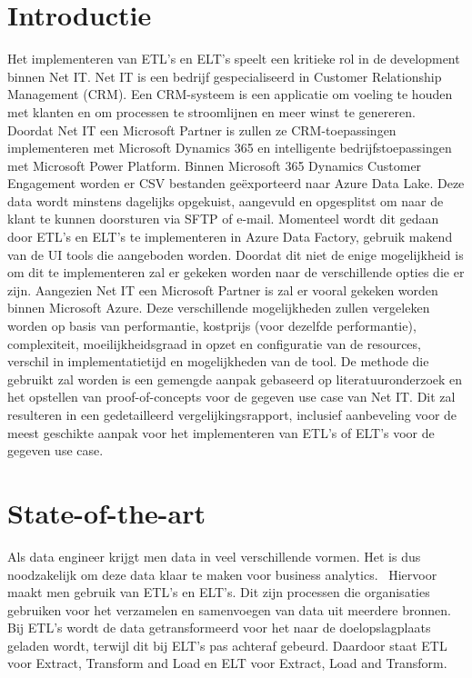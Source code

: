 
\section{Introductie}%
\label{sec:introductie}

Het implementeren van ETL's en ELT's speelt een kritieke rol in de development binnen Net IT. Net IT is een bedrijf gespecialiseerd in Customer Relationship Management (CRM). Een CRM-systeem is een applicatie om voeling te houden met klanten en om processen te stroomlijnen en meer winst te genereren. Doordat Net IT een Microsoft Partner is zullen ze CRM-toepassingen implementeren met Microsoft Dynamics 365 en intelligente bedrijfstoepassingen met Microsoft Power Platform. Binnen Microsoft 365 Dynamics Customer Engagement worden er CSV bestanden geëxporteerd naar Azure Data Lake. Deze data wordt minstens dagelijks opgekuist, aangevuld en opgesplitst om naar de klant te kunnen doorsturen via SFTP of e-mail. Momenteel wordt dit gedaan door ETL's en ELT's te implementeren in Azure Data Factory, gebruik makend van de UI tools die aangeboden worden. Doordat dit niet de enige mogelijkheid is om dit te implementeren zal er gekeken worden naar de verschillende opties die er zijn. Aangezien Net IT een Microsoft Partner is zal er vooral gekeken worden binnen Microsoft Azure. Deze verschillende mogelijkheden zullen vergeleken worden op basis van performantie, kostprijs (voor dezelfde performantie), complexiteit, moeilijkheidsgraad in opzet en configuratie van de resources, verschil in implementatietijd en mogelijkheden van de tool. De methode die gebruikt zal worden is een gemengde aanpak gebaseerd op literatuuronderzoek en het opstellen van proof-of-concepts voor de gegeven use case van Net IT. Dit zal resulteren in een gedetailleerd vergelijkingsrapport, inclusief aanbeveling voor de meest geschikte aanpak voor het implementeren van ETL's of ELT's voor de gegeven use case.

\section{State-of-the-art}%
\label{sec:state-of-the-art}

Als data engineer krijgt men data in veel verschillende vormen. Het is dus noodzakelijk om deze data klaar te maken voor business analytics.~\autocite{Kromer2022} Hiervoor maakt men gebruik van ETL's en ELT's. Dit zijn processen die organisaties gebruiken voor het verzamelen en samenvoegen van data uit meerdere bronnen. Bij ETL's wordt de data getransformeerd voor het naar de doelopslagplaats geladen wordt, terwijl dit bij ELT's pas achteraf gebeurd. Daardoor staat ETL voor Extract, Transform and Load en ELT voor Extract, Load and Transform.~\autocite{Bartley2023} 

